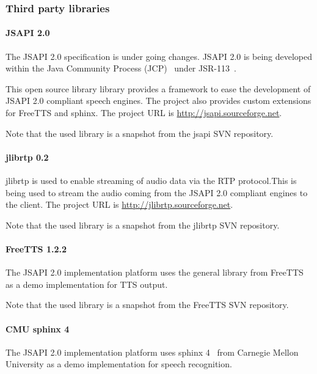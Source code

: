 \documentclass[11pt,a4paper]{article}
\begin{document}
\subsubsection{Third party libraries}
\label{sec:jsapi20-third-party-libr}

\paragraph{JSAPI 2.0}
\label{sec:jsapi20}

The JSAPI 2.0 specification is under going changes.
JSAPI 2.0 is being developed within
the Java Community Process (JCP)~\cite{jcp} under 
JSR-113~\cite{jcp:jsr113}.

This open source library library provides a framework to ease the development of
JSAPI 2.0 compliant speech engines. The project also provides custom extensions for
FreeTTS and sphinx. The project URL is \url{http://jsapi.sourceforge.net}.

Note that the used library is a snapshot from the jsapi SVN repository.

\paragraph{jlibrtp 0.2}

jlibrtp is used to enable streaming of audio data via the RTP protocol.This
is being used to stream the audio coming from the JSAPI 2.0 compliant
engines to the client. The project URL is \url{http://jlibrtp.sourceforge.net}.

Note that the used library is a snapshot from the jlibrtp SVN repository.

\paragraph{FreeTTS 1.2.2}

The JSAPI 2.0 implementation platform uses the general library from
FreeTTS~\cite{freetts} as a demo implementation for TTS output.

Note that the used library is a snapshot from the FreeTTS SVN repository.

\paragraph{CMU sphinx 4}
\label{sec:sphinx}

The JSAPI 2.0 implementation platform uses sphinx 4~\cite{sphinx} from
Carnegie Mellon University as a demo implementation for speech recognition.
\end{document}
